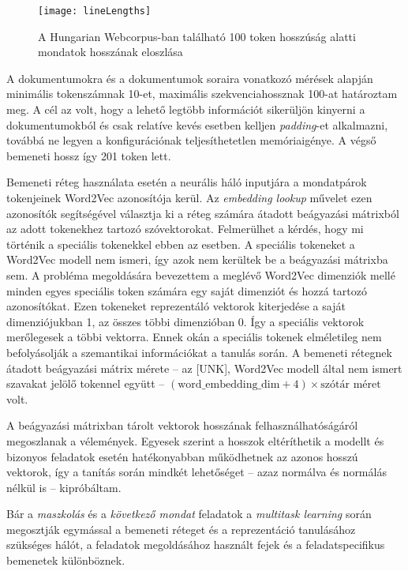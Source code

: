 \begin{figure}[H]
	\centering
	\texttt{[image: lineLengths]}
	\caption{A Hungarian Webcorpus-ban található 100 token hosszúság alatti mondatok hosszának eloszlása}
\end{figure}

A dokumentumokra és a dokumentumok soraira vonatkozó mérések alapján minimális tokenszámnak 10-et, maximális szekvenciahossznak 100-at határoztam meg. A cél az volt, hogy a lehető legtöbb információt sikerüljön kinyerni a dokumentumokból és csak relatíve kevés esetben kelljen \textit{padding}-et alkalmazni, továbbá ne legyen a konfigurációnak teljesíthetetlen memóriaigénye. A végső bemeneti hossz így 201 token lett.

Bemeneti réteg használata esetén a neurális háló inputjára a mondatpárok tokenjeinek Word2Vec azonosítója kerül. Az \textit{embedding lookup} művelet ezen azonosítók segítségével választja ki a réteg számára átadott beágyazási mátrixból az adott tokenekhez tartozó szóvektorokat. Felmerülhet a kérdés, hogy mi történik a speciális tokenekkel ebben az esetben. A speciális tokeneket a Word2Vec modell nem ismeri, így azok nem kerültek be a beágyazási mátrixba sem. A probléma megoldására bevezettem a meglévő Word2Vec dimenziók mellé minden egyes speciális token számára egy saját dimenziót és hozzá tartozó azonosítókat. Ezen tokeneket reprezentáló vektorok kiterjedése a saját dimenziójukban 1, az összes többi dimenzióban 0. Így a speciális vektorok merőlegesek a többi vektorra. Ennek okán a speciális tokenek elméletileg nem befolyásolják a szemantikai információkat a tanulás során. A bemeneti rétegnek átadott beágyazási mátrix mérete – az [UNK], Word2Vec modell által nem ismert szavakat jelölő tokennel együtt – $(\text{word\_embedding\_dim} + 4) \times \text{szótár méret} $ volt.

A beágyazási mátrixban tárolt vektorok hosszának felhasználhatóságáról megoszlanak a vélemények. Egyesek szerint a hosszok eltéríthetik a modellt és bizonyos feladatok esetén hatékonyabban működhetnek az azonos hosszú vektorok, így a tanítás során mindkét lehetőséget – azaz normálva és normálás nélkül is – kipróbáltam.

Bár a \textit{maszkolás} és a \textit{következő mondat} feladatok a \textit{multitask learning} során megosztják egymással a bemeneti réteget és a reprezentáció tanulásához szükséges hálót, a feladatok megoldásához használt fejek és a feladatspecifikus bemenetek különböznek.


